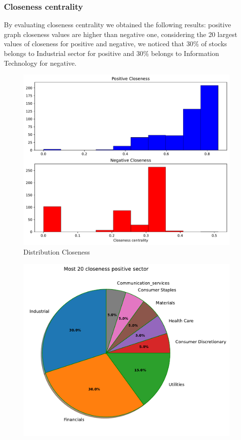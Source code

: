 \documentclass[sigchi]{acmart}
\begin{document}
\subsubsection{Closeness centrality}
By evaluating closeness centrality we obtained the following results: positive graph closeness values are higher than negative one, considering the 20 largest values of closeness for positive and negative, we noticed that $30\%$ of stocks belongs to Industrial sector for positive and $30\%$ belongs to Information Technology for negative.
\begin{figure}[h]
	\centering
	\includegraphics[width=\linewidth]{plot/distribution_closeness.pdf}
	\caption{Distribution Closeness}
\end{figure}
\begin{figure}[h]
	\centering
	\includegraphics[width=0.65\linewidth]{plot/pie_clos_pos.pdf}
\end{figure}
\end{document}
